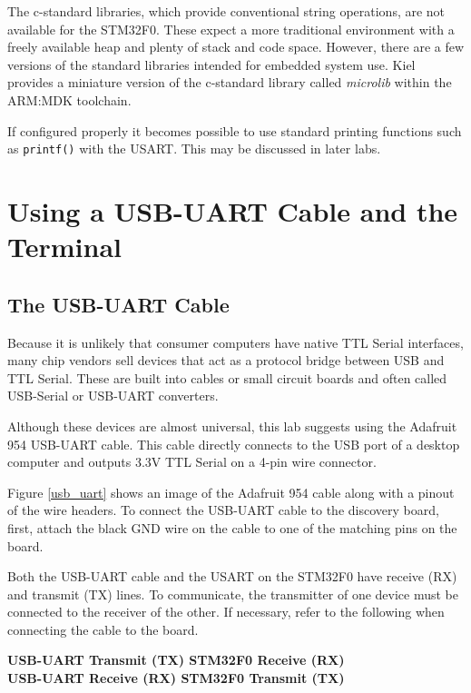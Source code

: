 \documentclass[openany,11pt,fleqn]{book} %
\begin{document}
The c-standard libraries, which provide conventional string operations, are not available for the STM32F0. These expect a more traditional environment with a freely available heap and plenty of stack and code space. However, there are a few versions of the standard libraries intended for embedded system use. Kiel provides a miniature version of the c-standard library called \textit{microlib} within the ARM:MDK toolchain.

If configured properly it becomes possible to use standard printing functions such as \texttt{printf()} with the USART. This may be discussed in later labs. 


\section{Using a USB-UART Cable and the Terminal}
\subsection{The USB-UART Cable}
Because it is unlikely that consumer computers have native TTL Serial interfaces, many chip vendors sell devices that act as a protocol bridge between USB and TTL Serial. These are built into cables or small circuit boards and often called USB-Serial or USB-UART converters. 

Although these devices are almost universal, this lab suggests using the Adafruit 954 USB-UART cable. This cable directly connects to the USB port of a desktop computer and outputs 3.3V TTL Serial on a 4-pin wire connector. 

Figure \ref{usb_uart} shows an image of the Adafruit 954 cable along with a pinout of the wire headers. To connect the USB-UART cable to the discovery board, first, attach the black GND wire on the cable to one of the matching pins on the board. 

Both the USB-UART cable and the USART on the STM32F0 have receive (RX) and transmit (TX) lines. To communicate, the transmitter of one device must be connected to the receiver of the other. If necessary, refer to the following when connecting the cable to the board. \\

\parbox{\textwidth} {
    \centering
    \textbf{USB-UART Transmit (TX) \textrightarrow  STM32F0 Receive (RX) \\
    USB-UART Receive (RX) \textrightarrow  STM32F0 Transmit (TX)}
}
    
\end{document}
